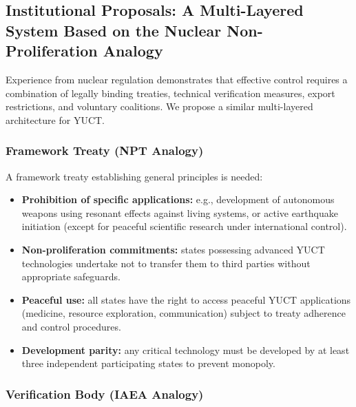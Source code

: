 \documentclass[12pt,a4paper]{article}
\theoremstyle{remark}
\begin{document}
	\subsection{Institutional Proposals: A Multi-Layered System Based on the Nuclear Non-Proliferation Analogy}
	\label{subsec:institutions}
	
	Experience from nuclear regulation demonstrates that effective control requires a combination of legally binding treaties, technical verification measures, export restrictions, and voluntary coalitions. We propose a similar multi-layered architecture for YUCT.
	
	\subsubsection{Framework Treaty (NPT Analogy)}
	
	A framework treaty establishing general principles is needed:
	\begin{itemize}
		\item \textbf{Prohibition of specific applications:} e.g., development of autonomous weapons using resonant effects against living systems, or active earthquake initiation (except for peaceful scientific research under international control).
		\item \textbf{Non-proliferation commitments:} states possessing advanced YUCT technologies undertake not to transfer them to third parties without appropriate safeguards.
		\item \textbf{Peaceful use:} all states have the right to access peaceful YUCT applications (medicine, resource exploration, communication) subject to treaty adherence and control procedures.
		\item \textbf{Development parity:} any critical technology must be developed by at least three independent participating states to prevent monopoly.
	\end{itemize}
	
	\subsubsection{Verification Body (IAEA Analogy)}
	
\end{document}
